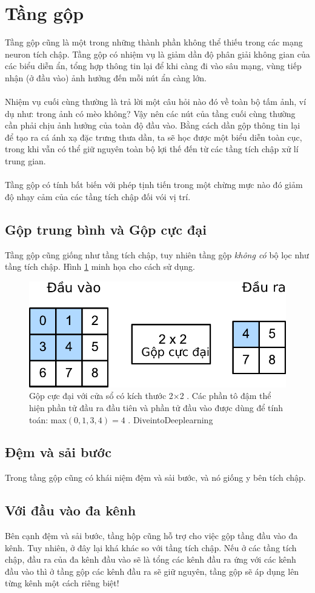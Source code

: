 \documentclass{article}
\begin{document}
\section{Tầng gộp}
Tầng gộp cũng là một trong những thành phần không thể thiếu trong các mạng neuron tích chập. Tầng gộp có nhiệm vụ là giảm dần độ phân giải không gian của các biểu diễn ẩn, tổng hợp thông tin lại để khi càng đi vào sâu mạng, vùng tiếp nhận (ở đầu vào) ảnh hưởng đến mỗi nút ẩn càng lớn.\\\\
Nhiệm vụ cuối cùng thường là trả lời một câu hỏi nào đó về toàn bộ tấm ảnh, ví dụ như: trong ảnh có mèo không? Vậy nên các nút của tầng cuối cùng thường cần phải chịu ảnh hưởng của toàn độ đầu vào. Bằng cách dần gộp thông tin lại để tạo ra cá ánh xạ đặc trưng thưa dần, ta sẽ học được một biểu diễn toàn cục, trong khi vẫn có thể giữ nguyên toàn bộ lợi thế đến từ các tầng tích chập xử lí trung gian.\\\\
Tầng gộp có tính bất biến với phép tịnh tiến trong một chừng mực nào đó giảm độ nhạy cảm của các tầng tích chập đối vói vị trí.
\subsection{Gộp trung bình và Gộp cực đại}
Tầng gộp cũng giống như tầng tích chập, tuy nhiên tầng gộp \textit{không có} bộ lọc như tầng tích chập. Hình \ref{fig5} minh họa cho cách sử dụng.
\begin{figure}[ht!]
    \centering
    \includegraphics[width = 0.5\linewidth]{pooling.pdf}
    \caption{Gộp cực đại với cửa sổ có kích thước  2×2
 . Các phần tô đậm thể hiện phần tử đầu ra đầu tiên và phần tử đầu vào được dùng để tính toán:  max$(0,1,3,4)=4$
 . DiveintoDeeplearning}
    \label{fig5}
\end{figure}
\subsection{Đệm và sải bước}
Trong tầng gộp cũng có khái niệm đệm và sải bước, và nó giống y bên tích chập.
\subsection{Với đầu vào đa kênh}
Bên cạnh đệm và sải bước, tầng hộp cũng hỗ trợ cho việc gộp tầng đầu vào đa kênh. Tuy nhiên, ở đây lại khá khác so với tầng tích chập. Nếu ở các tầng tích chập, đầu ra của đa kênh đầu vào sẽ là tổng các kênh đầu ra ứng với các kênh đầu vào thì ở tầng gộp các kênh đầu ra sẽ giữ nguyên, tầng gộp sẽ áp dụng lên từng kênh một cách riêng biệt!
\end{document}
